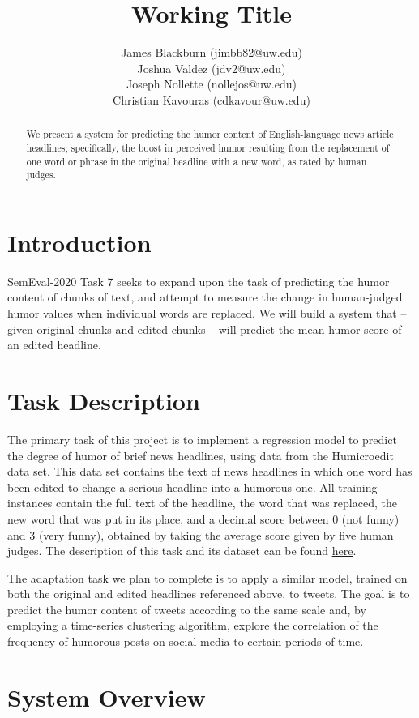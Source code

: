 \documentclass{article}
\title{Working Title}
\author{
James Blackburn (jimbb82@uw.edu)\\
Joshua Valdez (jdv2@uw.edu)\\
Joseph Nollette (nollejos@uw.edu)\\
Christian Kavouras (cdkavour@uw.edu)
}
\date{\vspace{-5ex}}
\begin{document}
\maketitle

\begin{abstract}
We present a system for predicting the humor content of English-language news article headlines; specifically, the boost in perceived humor resulting from the replacement of one word or phrase in the original headline with a new word, as rated by human judges.
\end{abstract}

\section{Introduction}
SemEval-2020 Task 7 seeks to expand upon the task of predicting the humor content of chunks of text, and attempt to measure the change in human-judged humor values when individual words are replaced. We will build a system that -- given original chunks and edited chunks -- will predict the mean humor score of an edited headline.

\section{Task Description}
The primary task of this project is to implement a regression model to predict the degree of humor of brief news headlines, using data from the Humicroedit data set. This data set contains the text of news headlines in which one word has been edited to change a serious headline into a humorous one. All training instances contain the full text of the headline, the word that was replaced, the new word that was put in its place, and a decimal score between 0 (not funny) and 3 (very funny), obtained by taking the average score given by five human judges. The description of this task and its dataset can be found \href{https://competitions.codalab.org/competitions/20970}{here}.\cite{hossain-etal-2019-president}

The adaptation task we plan to complete is to apply a similar model, trained on both the original and edited headlines referenced above, to tweets. The goal is to predict the humor content of tweets according to the same scale and, by employing a time-series clustering algorithm, explore the correlation of the frequency of humorous posts on social media to certain periods of time.

\section{System Overview}
\end{document}
